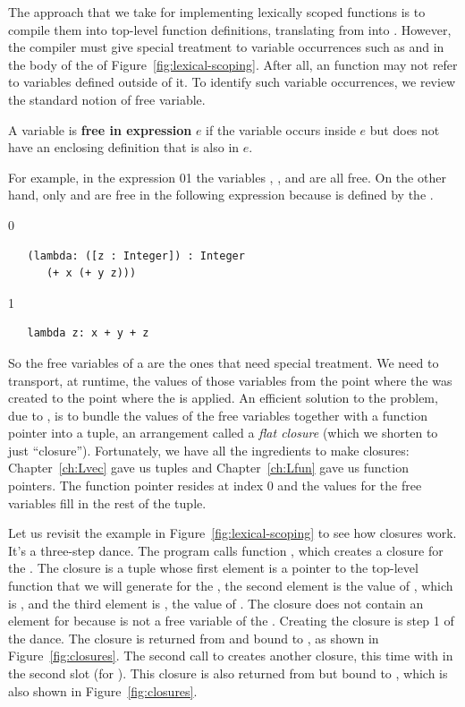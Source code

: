 \documentclass[7x10,nocrop]{TimesAPriori_MIT}%
\def\racketEd{0}
\def\pythonEd{1}
\def\edition{1}
\newcommand{\racket}[1]{{\if\edition\racketEd{#1}\fi}}
\newcommand{\python}[1]{{\if\edition\pythonEd #1\fi}}
\begin{document}
The approach that we take for implementing lexically scoped functions
is to compile them into top-level function definitions, translating
from \LangLam{} into \LangFun{}.  However, the compiler must give
special treatment to variable occurrences such as  and
 in the body of the  of
Figure~\ref{fig:lexical-scoping}. After all, an \LangFun{} function
may not refer to variables defined outside of it. To identify such
variable occurrences, we review the standard notion of free variable.

\begin{definition}
A variable is \textbf{free in expression} $e$ if the variable occurs
inside $e$ but does not have an enclosing definition that is also in
$e$.
\end{definition}

For example, in the expression
\racket{}\python{}
the variables , , and  are all free.  On the other hand,
only  and  are free in the following expression
because  is defined by the .
{\if\edition\racketEd
\begin{lstlisting}
   (lambda: ([z : Integer]) : Integer
      (+ x (+ y z)))
\end{lstlisting}
\fi}
{\if\edition\pythonEd
\begin{lstlisting}
   lambda z: x + y + z
\end{lstlisting}
\fi}
%
So the free variables of a  are the ones that need
special treatment. We need to transport, at runtime, the values of
those variables from the point where the  was created to
the point where the  is applied. An efficient solution to
the problem, due to \citet{Cardelli:1983aa}, is to bundle the values
of the free variables together with a function pointer into a tuple,
an arrangement called a \emph{flat closure} (which we shorten to just
``closure'').  
Fortunately, we have all the ingredients to make closures:
Chapter~\ref{ch:Lvec} gave us tuples and Chapter~\ref{ch:Lfun} gave us
function pointers. The function pointer resides at index $0$ and the
values for the free variables fill in the rest of the tuple.

Let us revisit the example in Figure~\ref{fig:lexical-scoping} to see
how closures work. It's a three-step dance. The program calls function
, which creates a closure for the . The closure
is a tuple whose first element is a pointer to the top-level function
that we will generate for the , the second element is the
value of , which is , and the third element is
, the value of . The closure does not contain an
element for  because  is not a free variable of the
. Creating the closure is step 1 of the dance. The
closure is returned from  and bound to , as shown in
Figure~\ref{fig:closures}.
%
The second call to  creates another closure, this time with
 in the second slot (for ). This closure is also
returned from  but bound to , which is also shown in
Figure~\ref{fig:closures}.
\end{document}
